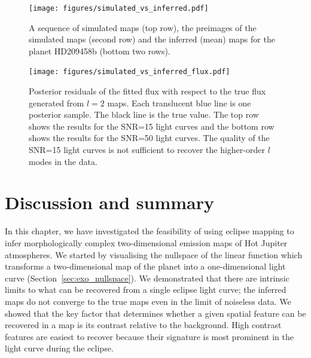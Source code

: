 \documentclass[12pt,dvipsnames]{report}
\begin{document}
\begin{figure}[t!]
    \begin{centering}
        \texttt{[image: figures/simulated\_vs\_inferred.pdf]}
        \caption{
           A sequence of simulated maps (top row), the preimages of the simulated maps 
           (second row) and the inferred (mean) maps for the planet HD209458b (bottom two 
           rows).
        }
        \label{fig:simulated_vs_inferred}
    \end{centering}
\end{figure}

\begin{figure}[t!]
    \begin{centering}
        \texttt{[image: figures/simulated\_vs\_inferred\_flux.pdf]}
        \caption{
            Posterior residuals of the fitted flux with respect to the true flux generated
            from $l=2$ maps. Each translucent blue line is one posterior sample. The black 
            line is the true value. The top row shows the results for the SNR=15 light curves
            and the bottom row shows the results for the SNR=50 light curves.
            The quality of the SNR=15 light curves is not sufficient to  recover 
            the higher-order $l$ modes in the data.
        }
        \label{fig:simulated_vs_inferred_fluxes}
    \end{centering}
\end{figure}

\section{Discussion and summary}
\label{sec:discussion}
In this chapter, we have investigated the feasibility of using eclipse mapping to
infer morphologically complex two-dimensional emission maps of Hot Jupiter atmospheres.
We started by visualising the nullspace of the linear function which transforms a two-dimensional map
of the planet into a one-dimensional light curve (Section~\ref{sec:exo_nullspace}). 
We demonstrated 
that there are intrinsic limits to what can be recovered from a single eclipse light curve;
the inferred maps do not converge to the true maps even in the limit of noiseless data.
We showed that the key factor that determines whether a given spatial feature can be 
recovered in a map is its contrast relative to the background. High contrast 
features are easiest to recover because their signature is most prominent in the
light curve during the eclipse.
\end{document}
